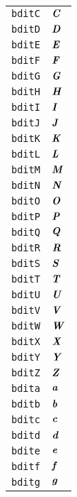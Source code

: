 \begin{longtable}{ll}
\texttt{bditC}&${}{\textbf{\textit{C}}}{}$\\
\texttt{bditD}&${}{\textbf{\textit{D}}}{}$\\
\texttt{bditE}&${}{\textbf{\textit{E}}}{}$\\
\texttt{bditF}&${}{\textbf{\textit{F}}}{}$\\
\texttt{bditG}&${}{\textbf{\textit{G}}}{}$\\
\texttt{bditH}&${}{\textbf{\textit{H}}}{}$\\
\texttt{bditI}&${}{\textbf{\textit{I}}}{}$\\
\texttt{bditJ}&${}{\textbf{\textit{J}}}{}$\\
\texttt{bditK}&${}{\textbf{\textit{K}}}{}$\\
\texttt{bditL}&${}{\textbf{\textit{L}}}{}$\\
\texttt{bditM}&${}{\textbf{\textit{M}}}{}$\\
\texttt{bditN}&${}{\textbf{\textit{N}}}{}$\\
\texttt{bditO}&${}{\textbf{\textit{O}}}{}$\\
\texttt{bditP}&${}{\textbf{\textit{P}}}{}$\\
\texttt{bditQ}&${}{\textbf{\textit{Q}}}{}$\\
\texttt{bditR}&${}{\textbf{\textit{R}}}{}$\\
\texttt{bditS}&${}{\textbf{\textit{S}}}{}$\\
\texttt{bditT}&${}{\textbf{\textit{T}}}{}$\\
\texttt{bditU}&${}{\textbf{\textit{U}}}{}$\\
\texttt{bditV}&${}{\textbf{\textit{V}}}{}$\\
\texttt{bditW}&${}{\textbf{\textit{W}}}{}$\\
\texttt{bditX}&${}{\textbf{\textit{X}}}{}$\\
\texttt{bditY}&${}{\textbf{\textit{Y}}}{}$\\
\texttt{bditZ}&${}{\textbf{\textit{Z}}}{}$\\
\texttt{bdita}&${}{\textbf{\textit{a}}}{}$\\
\texttt{bditb}&${}{\textbf{\textit{b}}}{}$\\
\texttt{bditc}&${}{\textbf{\textit{c}}}{}$\\
\texttt{bditd}&${}{\textbf{\textit{d}}}{}$\\
\texttt{bdite}&${}{\textbf{\textit{e}}}{}$\\
\texttt{bditf}&${}{\textbf{\textit{f}}}{}$\\
\texttt{bditg}&${}{\textbf{\textit{g}}}{}$\\

\end{longtable}
